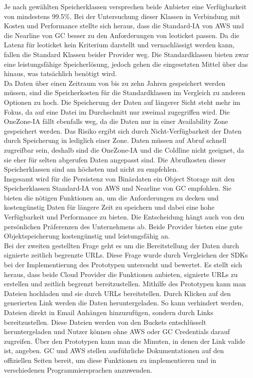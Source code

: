 Je nach gewählten Speicherklassen versprechen beide Anbieter eine Verfügbarkeit von mindestens 99.5\%. Bei der Untersuchung dieser Klassen in Verbindung mit Kosten und Performance stellte sich heraus, dass die Standard-IA von AWS und die Nearline von GC besser zu den Anforderungen von leoticket passen. Da die Latenz für leoticket kein Kriterium darstellt und vernachlässigt werden kann, fallen die Standard Klassen beider Provider weg. Die Standardklassen bieten zwar eine leistungsfähige Speicherlösung, jedoch gehen die eingesetzten Mittel über das hinaus, was tatsächlich benötigt wird.\\ 
 
 Da Daten über einen Zeitraum von bis zu zehn Jahren gespeichert werden müssen, sind die Speicherkosten für die Standardklassen im Vergleich zu anderen Optionen zu hoch. Die Speicherung der Daten auf längerer Sicht steht mehr im Fokus, da auf eine Datei im Durchschnitt nur zweimal zugegriffen wird. Die OneZone-IA fällt ebenfalls weg, da die Daten nur in einer Availability Zone gespeichert werden. Das Risiko ergibt sich durch Nicht-Verfügbarkeit der Daten durch Speicherung in lediglich einer Zone. Daten müssen auf Abruf schnell zugreifbar sein, deshalb sind die OneZone-IA und die Coldline nicht geeignet, da sie eher für selten abgerufen Daten angepasst sind. Die Abrufkosten dieser Speicherklassen sind am höchsten und nicht zu empfehlen.\\

Insgesamt wird für die Persistenz von Binärdaten ein Object Storage mit den Speicherklassen Standard-IA von AWS und Nearline von GC empfohlen. Sie bieten die nötigen Funktionen an, um die Anforderungen zu decken und kostengünstig Daten für längere Zeit zu speichern und dabei eine hohe Verfügbarkeit und Performance zu bieten. Die Entscheidung hängt auch von den persönlichen Präferenzen des Unternehmens ab. Beide Provider bieten eine gute Objektspeicherung kostengünstig und leistungsfähig an.\\

Bei der zweiten gestellten Frage geht es um die Bereitstellung der Daten durch signierte zeitlich begrenzte URLs. Diese Frage wurde durch Vergleichen der SDKs bei der Implementierung des Prototypen untersucht und bewertet. Es stellt sich heraus, dass beide Cloud Provider die Funktionen anbieten, signierte URLs zu erstellen und zeitlich begrenzt bereitzustellen. Mithilfe des Prototypen kann man Dateien hochladen und sie durch URLs bereitstellen. Durch Klicken auf den generierten Link werden die Daten heruntergeladen. So kann verhindert werden, Dateien direkt in Email Anhängen hinzuzufügen, sondern durch Links bereitzustellen. Diese Dateien werden von den Buckets entschlüsselt heruntergeladen und Nutzer können ohne AWS oder GC Credentials darauf zugreifen. Über den Prototypen kann man die Minuten, in denen der Link valide ist, angeben. GC und AWS stellen ausführliche Dokumentationen auf den offiziellen Seiten bereit, um diese Funktionen zu implementieren und in verschiedenen Programmiersprachen anzuwenden.\\

